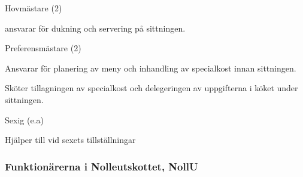 \documentclass[10pt]{article}
\begin{document}
\begin{emptylist}
    \item Hovmästare (2)
        \begin{dashlist}
        \item ansvarar för dukning och servering på sittningen.
        \end{dashlist}
    \item Preferensmästare (2)
        \begin{dashlist}
        \item Ansvarar för planering av meny och inhandling av specialkost innan sittningen.
        \item Sköter tillagningen av specialkost och delegeringen av uppgifterna i köket under sittningen.
        \end{dashlist}
    \item Sexig (e.a)
        \begin{dashlist}
        \item Hjälper till vid sexets tillställningar
        \end{dashlist}

\end{emptylist}
\subsubsection{Funktionärerna i Nolleutskottet, NollU}
\end{document}
